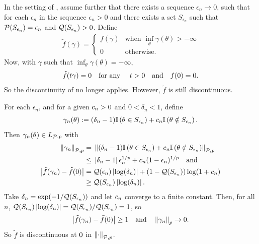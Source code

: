 \begin{ex}
%
In the setting of , assume further that there
exists a sequence $\epsilon_n \rightarrow 0$, such that for each $\epsilon_n$ in
the sequence $\epsilon_n > 0$ and there exists a set $S_{\epsilon_n}$ such that
$\mathcal{P}(S_{\epsilon_n}) = \epsilon_n$ and $\mathcal{Q}(S_{\epsilon_n}) > 0$. Define
%
\begin{align*}
%
\tilde{f}(\gamma) = \begin{cases}
    f(\gamma) & \textrm{when }\inf_\theta \gamma(\theta) > -\infty \\
    0 & \textrm{otherwise}.
\end{cases}
%
\end{align*}
%
Now, with $\gamma$ such that $\inf_\theta \gamma(\theta) = -\infty$,
%
\begin{align*}
%
\tilde{f}(\t \gamma) = 0 \mathtxt{for any }\t > 0 \mathtxt{and} f(\phiz) = 0.
%
\end{align*}
%
So the discontinuity of  no longer applies.
However, $\tilde{f}$ is still discontinuous.

For each $\epsilon_n$, and for a given $c_n > 0$ and $0 < \delta_n < 1$, define
%
\begin{align*}
%
\gamma_n(\theta) :=
(\delta_n - 1)\ind{\theta \in S_{\epsilon_n}} +
\c_n \ind{\theta \notin S_{\epsilon_n}}.
%
\end{align*}
%
Then $\gamma_n(\theta) \in {L_{\mathcal{P},p}}$ with
%
\begin{align*}
%
\norm{\gamma_n}_{\p,p} ={}&
\norm{(\delta_n - 1) \ind{\theta \in S_{\epsilon_n}} +
      \c_n \ind{\theta \notin S_{\epsilon_n}}}_{\p,p}
\\\le{}&
    \abs{\delta_n - 1} \epsilon_n^{1/p} +
    \c_n ( 1 - \epsilon_n)^{1/p}
\mathand\\
%
\abs{\tilde{f}(\gamma_n) - \tilde{f}(\phiz)}
={}&
    \q(\epsilon_n) \abs{\log(\delta_n)} +
    (1 - \q(S_{\epsilon_n})) \log(1 + \c_n)
\\\ge{}&
    \q(S_{\epsilon_n}) \abs{\log(\delta_n)}.
%
\end{align*}
Take $\delta_n = \exp(-1 / \mathcal{Q}(S_{\epsilon_n}))$ and let $c_n$ converge to a
finite constant.  Then, for all $n$, $\mathcal{Q}(S_{\epsilon_n}) \left|\log(\delta_n)\right|
= \mathcal{Q}(S_{\epsilon_n}) / \mathcal{Q}(S_{\epsilon_n}) = 1$, so
%
\begin{align*}
%
\abs{\tilde{f}(\gamma_n) - \tilde{f}(\phiz)} \ge{} 1
\mathtxt{and}
\norm{\gamma_n}_p \rightarrow{} 0.
%
\end{align*}
%
So $\tilde{f}$ is discontinuous at $0$ in $\left\Vert\cdot\right\Vert_{\mathcal{P}, p}$.
%
\end{ex}

